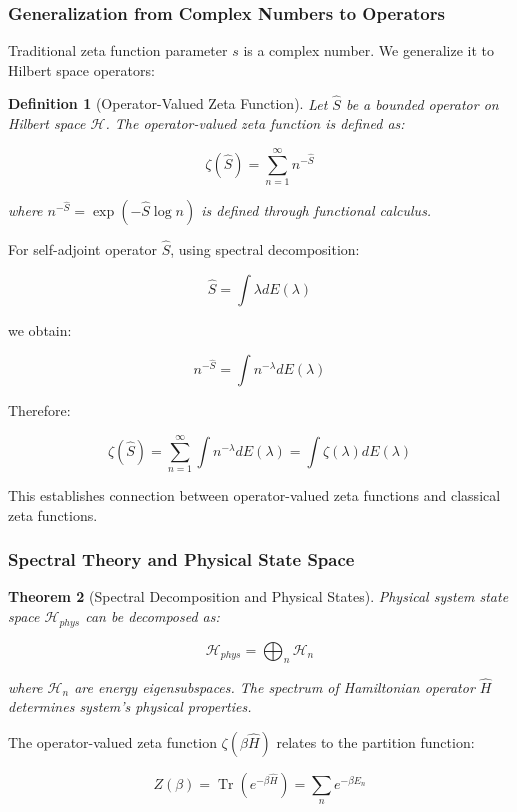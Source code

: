 \documentclass[12pt,a4paper]{article}
\newtheorem{theorem}{Theorem}[section]
\newtheorem{definition}[theorem]{Definition}
\DeclareMathOperator{\Tr}{Tr}
\begin{document}
\subsubsection{Generalization from Complex Numbers to Operators}

Traditional zeta function parameter $s$ is a complex number. We generalize it to Hilbert space operators:

\begin{definition}[Operator-Valued Zeta Function]
Let $\hat{S}$ be a bounded operator on Hilbert space $\mathcal{H}$. The operator-valued zeta function is defined as:

$$\zeta(\hat{S}) = \sum_{n=1}^{\infty} n^{-\hat{S}}$$

where $n^{-\hat{S}} = \exp(-\hat{S} \log n)$ is defined through functional calculus.
\end{definition}

For self-adjoint operator $\hat{S}$, using spectral decomposition:

$$\hat{S} = \int \lambda dE(\lambda)$$

we obtain:

$$n^{-\hat{S}} = \int n^{-\lambda} dE(\lambda)$$

Therefore:

$$\zeta(\hat{S}) = \sum_{n=1}^{\infty} \int n^{-\lambda} dE(\lambda) = \int \zeta(\lambda) dE(\lambda)$$

This establishes connection between operator-valued zeta functions and classical zeta functions.

\subsubsection{Spectral Theory and Physical State Space}

\begin{theorem}[Spectral Decomposition and Physical States]
Physical system state space $\mathcal{H}_{phys}$ can be decomposed as:

$$\mathcal{H}_{phys} = \bigoplus_{n} \mathcal{H}_n$$

where $\mathcal{H}_n$ are energy eigensubspaces. The spectrum of Hamiltonian operator $\hat{H}$ determines system's physical properties.
\end{theorem}

The operator-valued zeta function $\zeta(\beta\hat{H})$ relates to the partition function:

$$Z(\beta) = \Tr(e^{-\beta\hat{H}}) = \sum_n e^{-\beta E_n}$$
\end{document}
